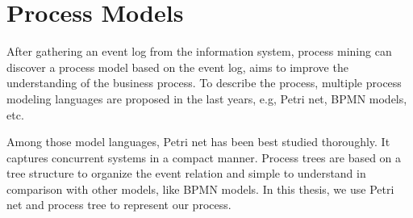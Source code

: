 \section{Process Models}
After gathering an event log from the information system, process mining can discover a process model based on the event log, aims to improve the understanding of the business process. To describe the process, multiple process modeling languages are proposed in the last years, e.g, Petri net, BPMN models, etc. 

Among those model languages, Petri net has been best studied thoroughly. It captures concurrent systems in a compact manner. Process trees are based on a tree structure to organize the event relation and simple to understand in comparison with other models, like BPMN models. In this thesis, we use Petri net and process tree to represent our process.
